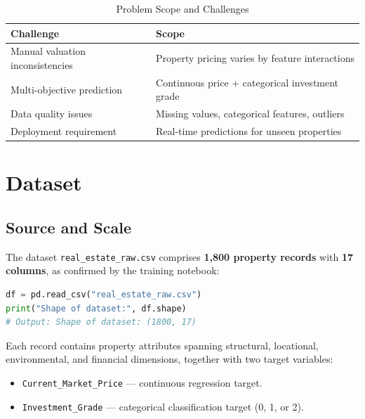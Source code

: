 \documentclass[12pt,a4paper]{article}
\begin{document}
\begin{table}[H]
\centering
\caption{Problem Scope and Challenges}
\begin{tabular}{@{} p{5.5cm} p{8.5cm} @{}}
\toprule
\textbf{Challenge} & \textbf{Scope} \\
\midrule
Manual valuation inconsistencies & Property pricing varies by feature interactions \\
\addlinespace
Multi-objective prediction       & Continuous price + categorical investment grade \\
\addlinespace
Data quality issues              & Missing values, categorical features, outliers \\
\addlinespace
Deployment requirement           & Real-time predictions for unseen properties \\
\bottomrule
\end{tabular}
\end{table}

\section{Dataset}

\subsection{Source and Scale}

The dataset \texttt{real\_estate\_raw.csv} comprises \textbf{1,800 property records} with
\textbf{17 columns}, as confirmed by the training notebook:

\begin{lstlisting}[language=Python, caption={Dataset Loading}]
df = pd.read_csv("real_estate_raw.csv")
print("Shape of dataset:", df.shape)
# Output: Shape of dataset: (1800, 17)
\end{lstlisting}

Each record contains property attributes spanning structural, locational, environmental, and
financial dimensions, together with two target variables:

\begin{itemize}[noitemsep]
    \item \texttt{Current\_Market\_Price} --- continuous regression target.
    \item \texttt{Investment\_Grade} --- categorical classification target (0, 1, or 2).
\end{itemize}
\end{document}
